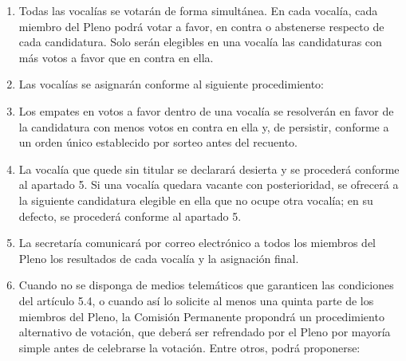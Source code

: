 \documentclass[11pt,a4paper]{article}
\begin{document}
\begin{enumerate}
\begin{enumerate}
    \item Todas las vocalías se votarán de forma simultánea. En cada vocalía, cada miembro del Pleno podrá votar a favor, en contra o abstenerse respecto de cada candidatura. Solo serán elegibles en una vocalía las candidaturas con más votos a favor que en contra en ella.
    \item Las vocalías se asignarán conforme al siguiente procedimiento:
    \item Los empates en votos a favor dentro de una vocalía se resolverán en favor de la candidatura con menos votos en contra en ella y, de persistir, conforme a un orden único establecido por sorteo antes del recuento.
    \item La vocalía que quede sin titular se declarará desierta y se procederá conforme al apartado 5. Si una vocalía quedara vacante con posterioridad, se ofrecerá a la siguiente candidatura elegible en ella que no ocupe otra vocalía; en su defecto, se procederá conforme al apartado 5.
    \item La secretaría comunicará por correo electrónico a todos los miembros del Pleno los resultados de cada vocalía y la asignación final.
    \item Cuando no se disponga de medios telemáticos que garanticen las condiciones del artículo 5.4, o cuando así lo solicite al menos una quinta parte de los miembros del Pleno, la Comisión Permanente propondrá un procedimiento alternativo de votación, que deberá ser refrendado por el Pleno por mayoría simple antes de celebrarse la votación. Entre otros, podrá proponerse:
\end{enumerate}
\end{enumerate}
\end{document}
